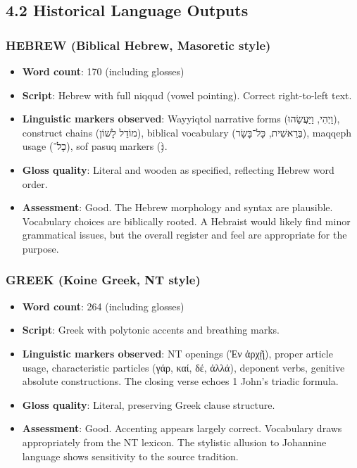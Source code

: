\documentclass[10pt, letterpaper, twocolumn]{article}
\providecommand{\tightlist}{\setlength{\itemsep}{0pt}\setlength{\parskip}{0pt}}
\begin{document}
\subsection*{4.2 Historical Language Outputs}\label{historical-language-outputs}

\subsubsection*{HEBREW (Biblical Hebrew, Masoretic style)}\label{hebrew-biblical-hebrew-masoretic-style}

\begin{itemize}
\tightlist
\item
  \textbf{Word count}: 170 (including glosses)
\item
  \textbf{Script}: Hebrew with full niqqud (vowel pointing). Correct right-to-left text.
\item
  \textbf{Linguistic markers observed}: Wayyiqtol narrative forms (וַיְהִי, וַיַּעֲשֵׂהוּ), construct chains (מוֹדֵל לָשׁוֹן), biblical vocabulary (בְּרֵאשִׁית, כָּל־בָּשָׂר), maqqeph usage (כָל־), sof pasuq markers (׃).
\item
  \textbf{Gloss quality}: Literal and wooden as specified, reflecting Hebrew word order.
\item
  \textbf{Assessment}: Good. The Hebrew morphology and syntax are plausible. Vocabulary choices are biblically rooted. A Hebraist would likely find minor grammatical issues, but the overall register and feel are appropriate for the purpose.
\end{itemize}

\subsubsection*{GREEK (Koine Greek, NT style)}\label{greek-koine-greek-nt-style}

\begin{itemize}
\tightlist
\item
  \textbf{Word count}: 264 (including glosses)
\item
  \textbf{Script}: Greek with polytonic accents and breathing marks.
\item
  \textbf{Linguistic markers observed}: NT openings (Ἐν ἀρχῇ), proper article usage, characteristic particles (γάρ, καί, δέ, ἀλλά), deponent verbs, genitive absolute constructions. The closing verse echoes 1 John's triadic formula.
\item
  \textbf{Gloss quality}: Literal, preserving Greek clause structure.
\item
  \textbf{Assessment}: Good. Accenting appears largely correct. Vocabulary draws appropriately from the NT lexicon. The stylistic allusion to Johannine language shows sensitivity to the source tradition.
\end{itemize}
\end{document}
